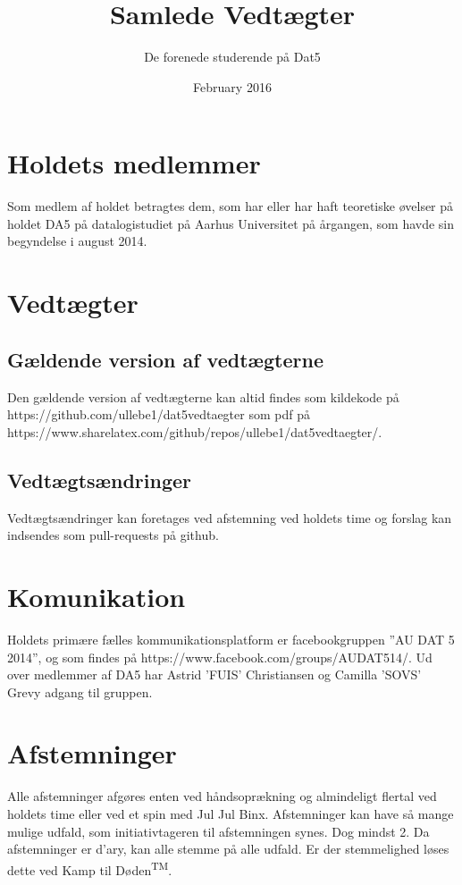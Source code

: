 \documentclass{article}
\title{Samlede Vedtægter}
\author{De forenede studerende på Dat5}
\date{February 2016}
\begin{document}
	
	\maketitle
	
	\section{Holdets medlemmer}
	Som medlem af holdet betragtes dem, som har eller har haft teoretiske øvelser på holdet DA5 på datalogistudiet på Aarhus Universitet på årgangen, som havde sin begyndelse i august 2014.
	
	\section{Vedtægter}
	\subsection{Gældende version af vedtægterne}
	Den gældende version af vedtægterne kan altid findes som kildekode på\\ https://github.com/ullebe1/dat5vedtaegter som pdf på\\ https://www.sharelatex.com/github/repos/ullebe1/dat5vedtaegter/.
	\subsection{Vedtægtsændringer}
	Vedtægtsændringer kan foretages ved afstemning ved holdets time og forslag kan indsendes som pull-requests på github.
	
	\section{Komunikation}
	Holdets primære fælles kommunikationsplatform er facebookgruppen ”AU DAT 5 2014”, og som findes på https://www.facebook.com/groups/AUDAT514/. Ud over medlemmer af DA5 har Astrid 'FUIS' Christiansen og Camilla 'SOVS' Grevy adgang til gruppen.
	
	\section{Afstemninger}
	Alle afstemninger afgøres enten ved håndsoprækning og almindeligt flertal ved holdets time eller ved et spin med Jul Jul Binx. Afstemninger kan have så mange mulige udfald, som initiativtageren til afstemningen synes. Dog mindst 2. Da afstemninger er d'ary, kan alle stemme på alle udfald. Er der stemmelighed løses dette ved Kamp til Døden\textsuperscript{TM}.
\end{document}
